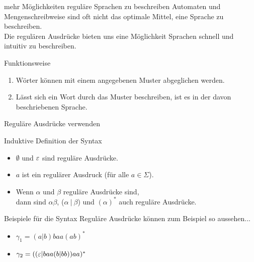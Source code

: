 %
%
%
%

\begin{frame}[fragile]{mehr Möglichkeiten reguläre Sprachen zu beschreiben}
    Automaten und Mengenschreibweise sind oft nicht das optimale Mittel, eine Sprache zu beschreiben.\\
    Die \alert{regulären Ausdrücke} bieten uns eine Möglichkeit Sprachen schnell und intuitiv zu beschreiben.
    \begin{alertblock}{Funktionsweise}
        \begin{enumerate}
            \item Wörter können mit einem angegebenen Muster abgeglichen werden.
            \item Lässt sich ein Wort durch das Muster beschreiben, ist es in der davon beschriebenen Sprache.
        \end{enumerate}
    \end{alertblock}
\end{frame}

\begin{frame}{Reguläre Ausdrücke verwenden}
    \begin{alertblock}{Induktive Definition der Syntax}
        \begin{itemize}
            \item \alert{$\emptyset$} und \alert{$\varepsilon$} sind reguläre Ausdrücke.
            \item \alert{$a$} ist ein regulärer Ausdruck (für alle $a \in \Sigma$).
            \item Wenn \alert{$\alpha$} und \alert{$\beta$} reguläre Ausdrücke sind,\\dann sind \alert{$\alpha \beta$}, \alert{($\alpha \ |\ \beta$)} und \alert{$(\alpha)^*$} auch reguläre Ausdrücke.
        \end{itemize}
    \end{alertblock}
    \begin{exampleblock}{Beispiele für die Syntax}
        Reguläre Ausdrücke können zum Beispiel so aussehen...
        \begin{itemize}

            \item $\gamma_1 = (a | b) baa (ab)^*$
            \item $\gamma_2 = ((\varepsilon | baa (b | bb)) aa)^*$
        \end{itemize}
    \end{exampleblock}
\end{frame}

